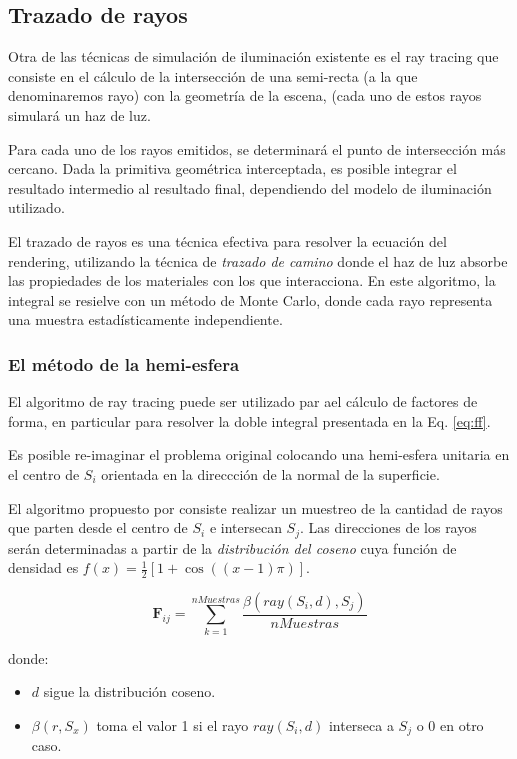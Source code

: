 \subsection{Trazado de rayos}
\label{sec:raytracing}

Otra de las técnicas de simulación de iluminación existente es el ray tracing que consiste en el cálculo de la intersección de una semi-recta (a la que denominaremos rayo) con la geometría de la escena, (cada uno de estos rayos simulará un haz de luz.

Para cada uno de los rayos emitidos, se determinará el punto de intersección más cercano. Dada la primitiva geométrica interceptada, es posible integrar el resultado intermedio al resultado final, dependiendo del modelo de iluminación utilizado.

El trazado de rayos es una técnica efectiva \cite{Kajiya} para resolver la ecuación del rendering, utilizando la técnica de \textit{trazado de camino} donde el haz de luz absorbe las propiedades de los materiales con los que interacciona. En este algoritmo, la integral se resielve con un método de Monte Carlo, donde cada rayo representa una muestra estadísticamente independiente.

\subsubsection{El método de la hemi-esfera}

El algoritmo de ray tracing puede ser utilizado par ael cálculo de factores de forma, en particular para resolver la doble integral presentada en la Eq. \eqref{eq:ff}.

Es posible re-imaginar el problema original colocando una hemi-esfera unitaria en el centro de $S_{i}$ orientada en la direccción de la normal de la superficie.

El algoritmo propuesto por \citeauthor{Malley}  consiste realizar un muestreo de la cantidad de  rayos que parten desde el centro de $S_{i}$ e intersecan $S_{j}$. Las direcciones de los rayos serán determinadas a partir de la \textit{distribución del coseno} cuya función de densidad es $f(x) = \frac{1}{2}[1 + \cos((x-1)\pi)]$.

\begin{equation}
	\mathbf{F}_{ij} = \sum_{k=1}^{nMuestras} \frac{\beta(ray(S_{i},d), S_{j})}{nMuestras} 
	\label{eq:ffhemiesfera}
\end{equation}

donde:
	
	\begin{itemize}
		\item  $d$ sigue la distribución coseno.
		\item $\beta(r, S_{x})$ toma el valor 1 si el rayo $ray(S_{i},d)$ interseca a $S_{j}$ o $0$ en otro caso.
	\end{itemize}

